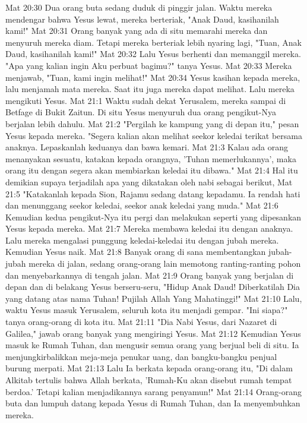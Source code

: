 Mat 20:30  Dua orang buta sedang duduk di pinggir jalan. Waktu mereka mendengar bahwa Yesus lewat, mereka berteriak, "Anak Daud, kasihanilah kami!"
Mat 20:31  Orang banyak yang ada di situ memarahi mereka dan menyuruh mereka diam. Tetapi mereka berteriak lebih nyaring lagi, "Tuan, Anak Daud, kasihanilah kami!"
Mat 20:32  Lalu Yesus berhenti dan memanggil mereka. "Apa yang kalian ingin Aku perbuat bagimu?" tanya Yesus.
Mat 20:33  Mereka menjawab, "Tuan, kami ingin melihat!"
Mat 20:34  Yesus kasihan kepada mereka, lalu menjamah mata mereka. Saat itu juga mereka dapat melihat. Lalu mereka mengikuti Yesus.
Mat 21:1  Waktu sudah dekat Yerusalem, mereka sampai di Betfage di Bukit Zaitun. Di situ Yesus menyuruh dua orang pengikut-Nya berjalan lebih dahulu.
Mat 21:2  "Pergilah ke kampung yang di depan itu," pesan Yesus kepada mereka. "Segera kalian akan melihat seekor keledai terikat bersama anaknya. Lepaskanlah keduanya dan bawa kemari.
Mat 21:3  Kalau ada orang menanyakan sesuatu, katakan kepada orangnya, 'Tuhan memerlukannya', maka orang itu dengan segera akan membiarkan keledai itu dibawa."
Mat 21:4  Hal itu demikian supaya terjadilah apa yang dikatakan oleh nabi sebagai berikut,
Mat 21:5  "Katakanlah kepada Sion, Rajamu sedang datang kepadamu. Ia rendah hati dan menunggang seekor keledai, seekor anak keledai yang muda."
Mat 21:6  Kemudian kedua pengikut-Nya itu pergi dan melakukan seperti yang dipesankan Yesus kepada mereka.
Mat 21:7  Mereka membawa keledai itu dengan anaknya. Lalu mereka mengalasi punggung keledai-keledai itu dengan jubah mereka. Kemudian Yesus naik.
Mat 21:8  Banyak orang di sana membentangkan jubah-jubah mereka di jalan, sedang orang-orang lain memotong ranting-ranting pohon dan menyebarkannya di tengah jalan.
Mat 21:9  Orang banyak yang berjalan di depan dan di belakang Yesus berseru-seru, "Hidup Anak Daud! Diberkatilah Dia yang datang atas nama Tuhan! Pujilah Allah Yang Mahatinggi!"
Mat 21:10  Lalu, waktu Yesus masuk Yerusalem, seluruh kota itu menjadi gempar. "Ini siapa?" tanya orang-orang di kota itu.
Mat 21:11  "Dia Nabi Yesus, dari Nazaret di Galilea," jawab orang banyak yang mengiringi Yesus.
Mat 21:12  Kemudian Yesus masuk ke Rumah Tuhan, dan mengusir semua orang yang berjual beli di situ. Ia menjungkirbalikkan meja-meja penukar uang, dan bangku-bangku penjual burung merpati.
Mat 21:13  Lalu Ia berkata kepada orang-orang itu, "Di dalam Alkitab tertulis bahwa Allah berkata, 'Rumah-Ku akan disebut rumah tempat berdoa.' Tetapi kalian menjadikannya sarang penyamun!"
Mat 21:14  Orang-orang buta dan lumpuh datang kepada Yesus di Rumah Tuhan, dan Ia menyembuhkan mereka.
